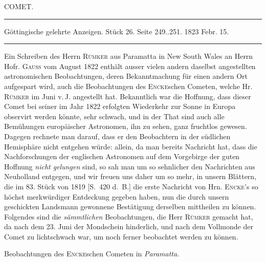 \clearpage
{}
\begin{center}
{\large COMET.}

\noindent\rule{\linewidth}{0.4pt}

Göttingische gelehrte Anzeigen. Stück 26. Seite 249..251. 1823 Febr. 15.

\noindent\rule{\linewidth}{0.4pt}
\end{center}

Ein Schreiben des Herrn \textsc{Rümker} aus Paramatta in New South Wales an Herrn Hofr. \textsc{Gauss} vom
August 1822 enthält ausser vielen andern daselbst angestellten astronomischen Beobachtungen,
deren Bekanntmachung für einen andern Ort aufgespart wird, auch die Beobachtungen des
\textsc{Encke}schen Cometen, welche Hr. \textsc{Rümker} im Juni v.\,J. angestellt hat. Bekanntlich war die
Hoffnung, dass dieser Comet bei seiner im Jahr 1822 erfolgten Wiederkehr zur Sonne in Europa
observirt werden könnte, sehr schwach, und in der That sind auch alle Bemühungen europäischer
Astronomen, ihn zu sehen, ganz fruchtlos gewesen. Dagegen rechnete man darauf, dass er den
Beobachtern in der südlichen Hemisphäre nicht entgehen würde: allein, da man bereits Nachricht
hat, dass die Nachforschungen der englischen Astronomen auf dem Vorgebirge der guten Hoffnung
\emph{nicht gelungen} sind, so sah man um so sehnlicher den Nachrichten aus Neuholland entgegen,
und wir freuen uns daher um so mehr, in unsern Blättern, die im 83. Stück von 1819 [S.~420 d.~B.]
die erste Nachricht von Hrn. \textsc{Encke}'s so höchst merkwürdiger Entdeckung gegeben haben, nun die
durch unsern geschickten Landsmann gewonnene Bestätigung derselben mittheilen zu können.
Folgendes sind die \emph{sämmtlichen} Beobachtungen, die Herr \textsc{Rümker} gemacht hat, da nach dem
23. Juni der Mondschein hinderlich, und nach dem Vollmonde der Comet zu lichtschwach war, um
noch ferner beobachtet werden zu können.

\begin{center}
Beobachtungen des \textsc{Encke}schen Cometen in \emph{Paramatta}.
\end{center}

